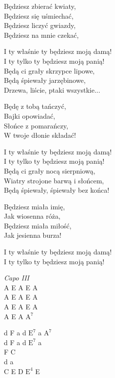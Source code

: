 \begin{text}
    \chordfill
    Będziesz zbierać kwiaty,\\
    Będziesz się uśmiechać,\\
    Będziesz liczyć gwiazdy,\\
    Będziesz na mnie czekać,

    I ty właśnie ty będziesz moją damą!\\
    I ty tylko ty będziesz moją panią!\\
    Będą ci grały skrzypce lipowe,\\
    Będą śpiewały jarzębinowe,\\
    Drzewa, liście, ptaki wszystkie...

    Będę z tobą tańczyć,\\
    Bajki opowiadać,\\
    Słońce z pomarańczy,\\
    W twoje dłonie składać!

    I ty właśnie ty będziesz moją damą!\\
    I ty tylko ty będziesz moją panią!\\
    Będą ci grały nocą sierpniową,\\
    Wiatry strojone barwą i słońcem,\\
    Będą śpiewały, śpiewały bez końca!

    Będziesz miała imię,\\
    Jak wiosenna róża,\\
    Będziesz miała miłość,\\
    Jak jesienna burza!

    I ty właśnie ty będziesz moją damą!\\
    I ty tylko ty będziesz moją panią!
\end{text}
\begin{chord}
    \textit{Capo III}\\
    A E A E A\\
    A E A E A\\
    A E A E A\\
    A E A $\mathrm{A^{7}}$

    d F a d $\mathrm{E^{7}}$ a $\mathrm{A^{7}}$\\
    d F a d $\mathrm{E^{7}}$ a\\
    F C\\
    d a\\
    C E D $\mathrm{E^{4}}$ E
\end{chord}
